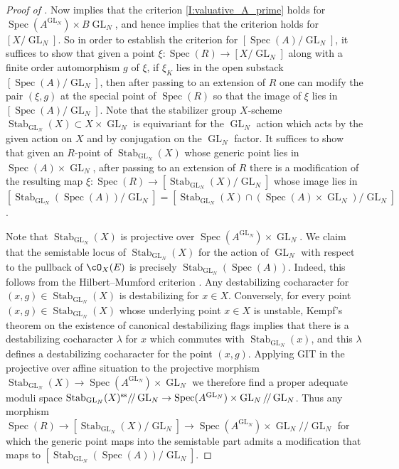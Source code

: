 \documentclass[a4paper]{amsart}
\numberwithin{equation}{section}
\theoremstyle{plain}
\theoremstyle{definition}
\DeclareMathOperator{\Spec}{Spec}
\DeclareMathOperator{\GL}{GL}
\newcommand{\co}{\colon}
\renewcommand{\ss}{{\rm ss}}
\DeclareMathOperator{\Stab}{Stab}
\begin{document}
\begin{proof}[Proof of ]
Now  implies that the criterion \ref{I:valuative_A_prime} holds for $\Spec(A^{\GL_N}) \times B\GL_N$, and hence  implies that the criterion holds for $[X/\GL_N]$. So in order to establish the criterion for $[\Spec(A)/\GL_N]$, it suffices to show that given a point $\xi \co \Spec(R) \to [X/\GL_N]$ along with a finite order automorphism $g$ of $\xi$, if $\xi_K$ lies in the open substack $[\Spec(A)/\GL_N]$, then after passing to an extension of $R$ one can modify the pair $(\xi,g)$ at the special point of $\Spec(R)$ so that the image of $\xi$ lies in $[\Spec(A)/\GL_N]$. Note that the stabilizer group $X$-scheme $\Stab_{\GL_N}(X) \subset X \times \GL_N$ is equivariant for the $\GL_N$ action which acts by the given action on $X$ and by conjugation on the $\GL_N$ factor. It suffices to show that given an $R$-point of $\Stab_{\GL_N}(X)$ whose generic point lies in $\Spec(A) \times \GL_N$, after passing to an extension of $R$ there is a modification of the resulting map $\xi \co \Spec(R) \to [\Stab_{\GL_N}(X) / \GL_N]$ whose image lies in $[\Stab_{\GL_N}(\Spec(A)) / \GL_N] = [ \Stab_{\GL_N}(X) \cap (\Spec(A) \times \GL_N) / \GL_N]$.

Note that $\Stab_{\GL_N}(X)$ is projective over $\Spec(A^{\GL_N}) \times \GL_N$. We claim that the semistable locus of $\Stab_{\GL_N}(X)$ for the action of $\GL_N$ with respect to the pullback of $\cO_X(E)$ is precisely $\Stab_{\GL_N}(\Spec(A))$. Indeed, this follows from the Hilbert--Mumford criterion \cite{Seshadri}. Any destabilizing cocharacter for $(x,g) \in \Stab_{\GL_N}(X)$ is destabilizing for $x \in X$. Conversely, for every point $(x,g) \in \Stab_{\GL_N}(X)$ whose underlying point $x \in X$ is unstable, Kempf's theorem on the existence of canonical destabilizing flags \cite{kempf1978instability} implies that there is a destabilizing cocharacter $\lambda$ for $x$ which commutes with $\Stab_{\GL_N}(x)$, and this $\lambda$ defines a destabilizing cocharacter for the point $(x,g)$. Applying GIT in the projective over affine situation to the projective morphism $\Stab_{\GL_N}(X) \to\Spec(A^{\GL_N}) \times \GL_N$ we therefore find a proper adequate moduli space $\Stab_{\GL_N}(X)^{\ss}/\!/\GL_N \to \Spec(A^{\GL_N}) \times \GL_N/\!/\GL_N$. Thus any morphism $\Spec(R) \to [\Stab_{\GL_N}(X) / \GL_N]  \to \Spec(A^{\GL_N}) \times \GL_N/\!/\GL_N$ for which the generic point maps into the semistable part admits a modification that maps to $[\Stab_{\GL_N}(\Spec(A)) / \GL_N]$.
\end{proof}
\end{document}
